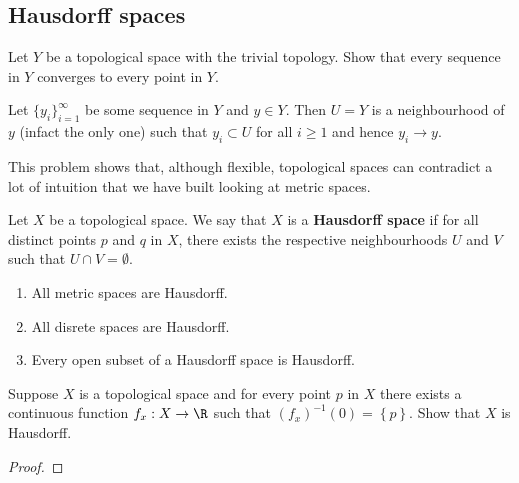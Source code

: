 
\subsection{Hausdorff spaces}

\begin{problem}
	Let $Y$ be a topological space with the trivial topology.
	Show that every sequence in $Y$ converges to every point in $Y$.
\end{problem}

\begin{solution}
	Let $ \{ y_i \}_{i=1}^\infty$ be some sequence in $Y$ and $y \in Y$.
	Then $U = Y$ is a neighbourhood of $y$ (infact the only one)
	such that $y_i \subset U$ for all $i \geq 1$ and hence
	$y_i \to y$.
\end{solution}

\begin{remark}
	This problem shows that, although flexible,
	topological spaces can contradict a lot of intuition that we have
	built looking at metric spaces.
\end{remark}

\begin{definition}
	Let $X$ be a topological space.
	We say that $X$ is a \textbf{Hausdorff space}
	if for all distinct points $p$ and $q$ in $X$,
	there exists the respective neighbourhoods
	$U$ and $V$ such that
	$U \cap V = \emptyset$.
\end{definition}

\begin{example}[]
	\hfill
	\begin{enumerate}
		\item All metric spaces are Hausdorff.
		\item All disrete spaces are Hausdorff.
		\item Every open subset of a Hausdorff space is Hausdorff.
	\end{enumerate}
\end{example}

\begin{problem}
	Suppose $X$ is a topological space
	and for every point $p$ in $X$ there exists a continuous function
	$f_x: X \to \R$ such that $ \left( f_x \right)^{-1}(0) = \left\{ p \right\}$.
	Show that $X$ is Hausdorff.
\end{problem}

\begin{proof}
\end{proof}

